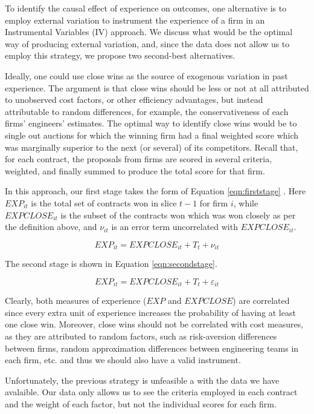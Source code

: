 To identify the causal effect of experience on outcomes, one alternative is to employ external variation to instrument the experience of a firm in an Instrumental Variables (IV) approach. We discuss what would be the optimal way of producing external variation, and, since the data does not allow us to employ this strategy, we propose two second-best alternatives.

Ideally, one could use close wins as the source of exogenous variation in past experience. The argument is that close wins should be less or not at all attributed to unobserved cost factors, or other efficiency advantages, but instead attributable to random differences, for example, the conservativeness of each firms' engineers' estimates. The optimal way to identify close wins would be to single out auctions for which the winning firm had a final weighted score which was marginally superior to the next (or several) of its competitors.  Recall that, for each contract, the  proposals from firms are scored in several criteria, weighted, and finally summed to produce the total score for that firm.

In this approach, our first stage takes the form of Equation \ref{eqn:firststage} . Here $EXP_{it}$ is the total set of contracts won in slice $t-1$ for firm $i$, while $EXPCLOSE_{it}$ is the subset of the contracts won which was won closely as per the definition above, and $\nu_{it}$ is an error term uncorrelated with $EXPCLOSE_{it}$.

\begin{equation}
\label{eqn:firststage}
EXP_{it}= EXPCLOSE_{it}+T_t+\nu_{it}
\end{equation}

The second stage is shown in Equation \ref{eqn:secondstage}.

\begin{equation}
\label{eqn:secondstage}
EXP_{it}= EXPCLOSE_{it}+T_t+\varepsilon_{it}
\end{equation}

Clearly, both measures of experience ($EXP$ and $EXPCLOSE$) are correlated since every extra unit of experience increases the probability of having at least one close win. Moreover, close wins should not be correlated with cost measures, as they are attributed to random factors, such as risk-aversion differences between firms, random approximation differences between engineering teams in each firm, etc. and thus we should also have a valid instrument.

Unfortunately, the previous strategy is unfeasible a with the data we have avalaible. Our data only allows us to see the criteria employed in each contract and the weight of each factor, but not the individual scores for each firm.

